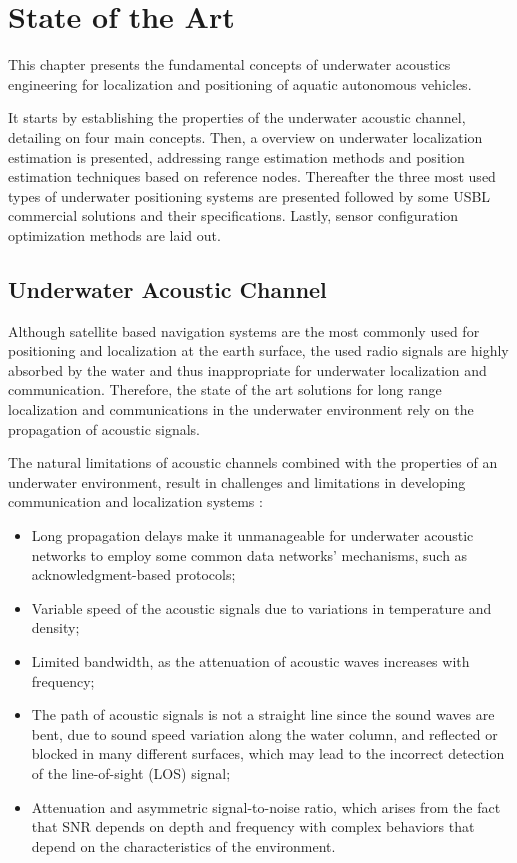 \chapter{State of the Art} \label{chap:sota}

This chapter presents the fundamental concepts of underwater acoustics engineering for localization and positioning of aquatic autonomous vehicles. 

It starts by establishing the properties of the underwater acoustic channel, detailing on four main concepts. Then, a overview on underwater localization estimation is presented, addressing range estimation methods and position estimation techniques based on reference nodes. Thereafter the three most used types of underwater positioning systems are presented followed by some USBL commercial solutions and their specifications. Lastly, sensor configuration optimization methods are laid out.

\section{Underwater Acoustic Channel} \label{subsec: acoustic-channel}

Although satellite based navigation systems are the most commonly used for positioning and localization at the earth surface, the used radio signals are highly absorbed by the water and thus inappropriate for underwater localization and communication. Therefore, the state of the art solutions for long range localization and communications in the underwater environment rely on the propagation of acoustic signals.

The natural limitations of acoustic channels combined with the properties of an underwater environment, result in challenges and limitations in developing communication and localization systems \cite{survey-tech-chall}:

\begin{itemize}
	\item Long propagation delays make it unmanageable for underwater acoustic networks to employ some common data networks' mechanisms, such as acknowledgment-based protocols;
	
	\item Variable speed of the acoustic signals due to variations in temperature and density;
	
	\item Limited bandwidth, as the attenuation of acoustic waves increases with frequency;
	
	\item The path of acoustic signals is not a straight line since the sound waves are bent, due to sound speed variation along the water column, and reflected or blocked in many different surfaces, which may lead to the incorrect detection of the line-of-sight (LOS) signal;
	
	\item Attenuation and asymmetric signal-to-noise ratio, which arises from the fact that SNR depends on depth and frequency with complex behaviors that depend on the characteristics of the environment.
	
\end{itemize}

